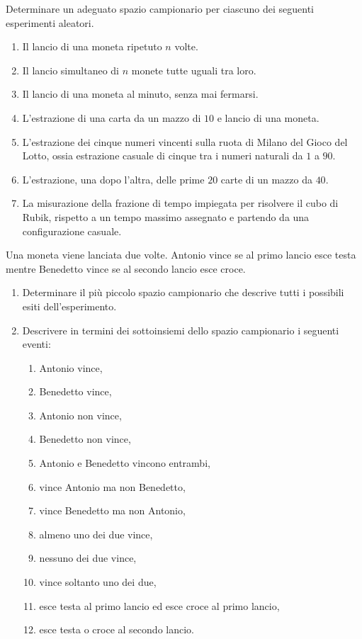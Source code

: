 
\ParteEsercizi

\Esercizio{}

Determinare un adeguato spazio campionario per ciascuno dei seguenti esperimenti aleatori.
\begin{enumerate}
\item Il lancio di una moneta ripetuto $n$ volte.
\item Il lancio simultaneo di $n$ monete tutte uguali tra loro.
\item Il lancio di una moneta al minuto, senza mai fermarsi.
\item L'estrazione di una carta da un mazzo di $10$ e lancio di una moneta.
\item L'estrazione dei cinque numeri vincenti sulla ruota di Milano del Gioco del Lotto, ossia estrazione casuale di cinque tra i numeri naturali da $1$ a $90$.
\item L'estrazione, una dopo l'altra, delle prime $20$ carte di un mazzo da $40$.
\item La misurazione della frazione di tempo impiegata per risolvere il cubo di Rubik, rispetto a un tempo massimo assegnato e partendo da una configurazione casuale.
\end{enumerate}

\Esercizio{}

Una moneta viene lanciata due volte. Antonio vince se al primo lancio esce testa mentre Benedetto vince se al secondo lancio esce croce.
\begin{enumerate}
\item Determinare il più piccolo spazio campionario che descrive tutti i possibili esiti dell'esperimento.
\item Descrivere in termini dei sottoinsiemi dello spazio campionario i seguenti eventi:
\begin{enumerate}
\item Antonio vince,
\item Benedetto vince,
\item Antonio non vince,
\item Benedetto non vince,
\item Antonio e Benedetto vincono entrambi,
\item vince Antonio ma non Benedetto,
\item vince Benedetto ma non Antonio,
\item almeno uno dei due vince,
\item nessuno dei due vince,
\item vince soltanto uno dei due,
\item esce testa al primo lancio ed esce croce al primo lancio,
\item esce testa o croce al secondo lancio.
\end{enumerate}
\end{enumerate}
\Esercizio{}

